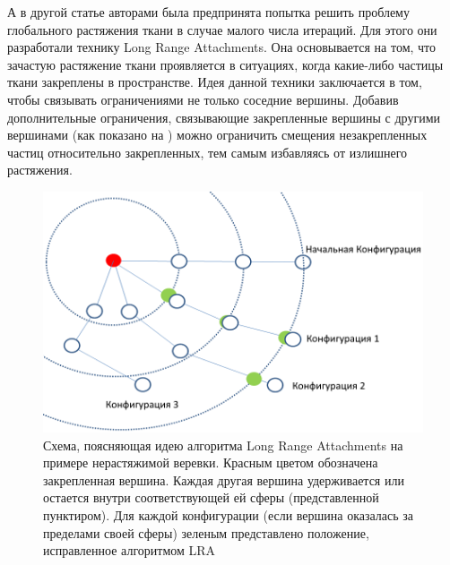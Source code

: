 	А в другой статье \cite{kim2012long} авторами была предпринята попытка решить проблему глобального растяжения ткани в случае малого числа итераций. Для этого они разработали технику Long Range Attachments. Она основывается на том, что зачастую растяжение ткани проявляется в ситуациях, когда какие-либо частицы ткани закреплены в пространстве. Идея данной техники заключается в том, чтобы связывать ограничениями не только соседние вершины. Добавив дополнительные ограничения, связывающие закрепленные вершины с другими вершинами (как показано на ) можно ограничить смещения незакрепленных частиц относительно закрепленных, тем самым избавляясь от излишнего растяжения.
	
	\begin{figure}[ht!] 
		\center
		\includegraphics [scale=0.9] {my_folder/images//lra}
		\caption{Схема, поясняющая идею алгоритма Long Range Attachments на примере нерастяжимой веревки. Красным цветом обозначена закрепленная вершина. Каждая другая вершина удерживается или остается внутри соответствующей ей сферы (представленной пунктиром). Для каждой конфигурации (если вершина оказалась за пределами своей сферы) зеленым представлено положение, исправленное алгоритмом LRA}
		\label{fig:lra}  
	\end{figure}
	
%
